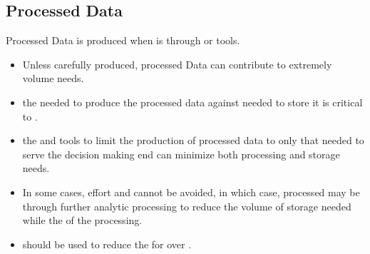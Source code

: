 \documentclass[letterpaper,10pt,english]{sphinxmanual}
\begin{document}
\subsection{Processed Data}
\label{\detokenize{requirements/data/processed:processed-data}}\label{\detokenize{requirements/data/processed::doc}}
\sphinxAtStartPar
Processed Data is produced when  is  through
 or  tools.
\begin{itemize}
\item {} 
\sphinxAtStartPar
Unless carefully produced, processed Data can contribute to extremely  volume needs.

\item {} 
\sphinxAtStartPar
{} the  needed to produce the processed data against  needed to store it is critical to .

\item {} 
\sphinxAtStartPar
{} the  and  tools to limit the production of processed data to only that needed to serve the decision making end can minimize both processing and storage needs.

\item {} 
\sphinxAtStartPar
In some cases,  effort and  cannot be avoided, in which case, processed may be  through further analytic processing to reduce the volume of storage needed while  the  of the processing.

\item {} 
\sphinxAtStartPar
{} should be used to reduce the  for  over .

\end{itemize}
\end{document}
